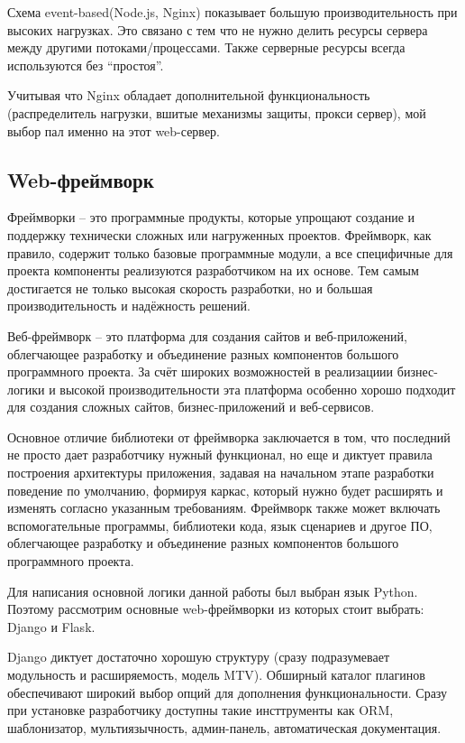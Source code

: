 Схема event-based(Node.js, Nginx) показывает большую производительность при
высоких нагрузках. Это связано с тем что не нужно делить ресурсы сервера между
другими потоками/процессами. Также серверные ресурсы всегда используются без
“простоя”.

Учитывая что Nginx обладает дополнительной функциональность (распределитель
нагрузки, вшитые механизмы защиты, прокси сервер), мой выбор пал именно на этот
web-сервер.

\subsection{Web-фреймворк}
Фреймворки -- это программные продукты, которые упрощают создание и поддержку
технически сложных или нагруженных проектов. Фреймворк, как правило, содержит
только базовые программные модули, а все специфичные для проекта компоненты
реализуются разработчиком на их основе. Тем самым достигается не только высокая
скорость разработки, но и большая производительность и надёжность решений.

Веб-фреймворк -- это платформа для создания сайтов и веб-приложений, облегчающее
разработку и объединение разных компонентов большого программного проекта. За
счёт широких возможностей в реализациии бизнес-логики и высокой
производительности эта платформа особенно хорошо подходит для создания сложных
сайтов, бизнес-приложений и веб-сервисов.

Основное отличие библиотеки от фреймворка заключается в том, что последний не
просто дает разработчику нужный функционал, но еще и диктует правила построения
архитектуры приложения, задавая на начальном этапе разработки поведение по
умолчанию, формируя каркас, который нужно будет расширять и изменять согласно
указанным требованиям. Фреймворк также может включать вспомогательные программы,
библиотеки кода, язык сценариев и другое ПО, облегчающее разработку и
объединение разных компонентов большого программного проекта.

Для написания основной логики данной работы был выбран язык Python. Поэтому
рассмотрим основные web-фреймворки из которых стоит выбрать: Django и Flask.

Django диктует достаточно хорошую структуру (сразу подразумевает модульность и
расширяемость, модель MTV). Обширный каталог плагинов обеспечивают широкий выбор
опций для дополнения функциональности. Сразу при установке разработчику доступны
такие инсттрументы как ORM, шаблонизатор, мультиязычность, админ-панель,
автоматическая документация.

